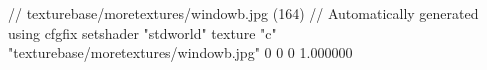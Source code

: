 // texturebase/moretextures/windowb.jpg (164)
// Automatically generated using cfgfix
setshader "stdworld"
texture "c" "texturebase/moretextures/windowb.jpg" 0 0 0 1.000000
